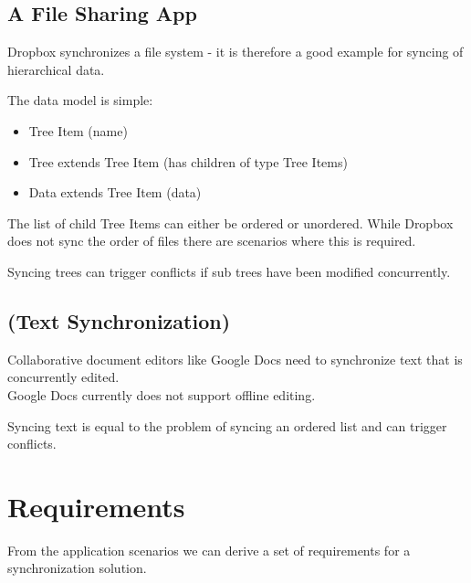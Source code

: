 \subsection{A File Sharing App}

Dropbox synchronizes a file system - it is therefore a good example for
syncing of hierarchical data.

The data model is simple:

\begin{itemize}
\item Tree Item (name)
\item Tree extends Tree Item (has children of type Tree Items)
\item Data extends Tree Item (data)
\end{itemize}

The list of child Tree Items can either be ordered or unordered. While
Dropbox does not sync the order of files there are scenarios where this
is required.

Syncing trees can trigger conflicts if sub trees have been modified
concurrently.

\subsection{(Text Synchronization)}

Collaborative document editors like Google Docs need to synchronize text
that is concurrently edited.\\Google Docs currently does not support
offline editing.

Syncing text is equal to the problem of syncing an ordered list and can
trigger conflicts.

\section{Requirements}
\label{sec:requirements}
From the application scenarios we can derive a set of requirements for a synchronization solution.

